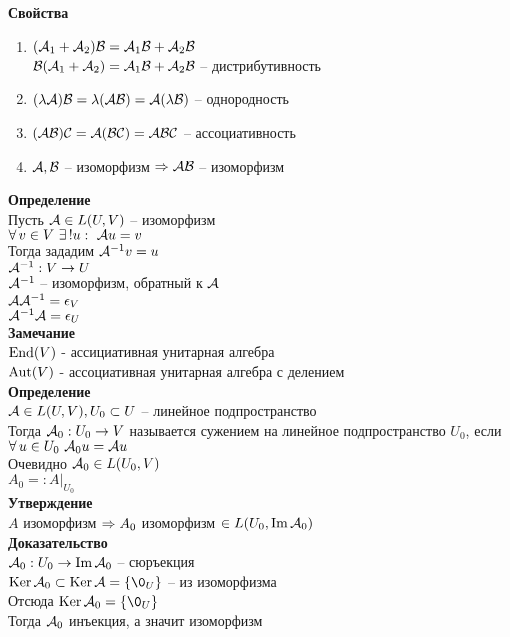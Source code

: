 \documentclass[12pt]{article}
\begin{document}
\textbf{Свойства}
\begin{enumerate}
    \item $(\mathcal{A}_1 + \mathcal{A}_2)\mathcal{B} = \mathcal{A}_1\mathcal{B} + \mathcal{A}_2\mathcal{B}$\\
    $\mathcal{B}(\mathcal{A}_1 + \mathcal{A}_2) = \mathcal{A}_1\mathcal{B} + \mathcal{A}_2\mathcal{B}$ -- дистрибутивность
    \item $(\lambda \mathcal{A})\mathcal{B} = \lambda (\mathcal{A} \mathcal{B}) = \mathcal{A} (\lambda \mathcal{B})$ -- однородность
    \item $(\mathcal{A} \mathcal{B}) \mathcal{C} = \mathcal{A}(\mathcal{B}\mathcal{C}) = \mathcal{A}\mathcal{B}\mathcal{C}$ -- ассоциативность
    \item $\mathcal{A}, \mathcal{B}$ -- изоморфизм $\Rightarrow \mathcal{A}\mathcal{B}$ -- изоморфизм
\end{enumerate}
\textbf{Определение}\\
Пусть $\mathcal{A} \in L(U, V)$ -- изоморфизм\\
$\forall\, v \in V\ \exists\,! u:\ \mathcal{A} u = v$\\
Тогда зададим $\mathcal{A}^{-1} v = u$\\
$\mathcal{A}^{-1}: V \rightarrow U$\\
$\mathcal{A}^{-1}$ -- изоморфизм, обратный к $\mathcal{A}$\\
$\mathcal{A}\mathcal{A}^{-1} = \epsilon_V$\\
$\mathcal{A}^{-1}\mathcal{A} = \epsilon_U$\\
\textbf{Замечание}\\
$\operatorname{End}(V)$ - ассициативная унитарная алгебра\\
$\operatorname{Aut}(V)$ - ассоциативная унитарная алгебра с делением\\
\textbf{Определение}\\
$\mathcal{A} \in L(U, V), U_0 \subset U$ -- линейное подпространство\\
Тогда $\mathcal{A}_0 : U_0 \rightarrow V$ называется сужением на линейное подпространство $U_0$, если $\forall\, u \in U_0\ \mathcal{A}_0u = \mathcal{A} u$\\
Очевидно $\mathcal{A}_0 \in L(U_0, V)$\\
$A_0 =: A|_{U_0}$\\
\textbf{Утверждение}\\
$A$ изоморфизм $\Rightarrow A_0 $ изоморфизм $\in L(U_0, \operatorname{Im} \mathcal{A}_0)$\\
\textbf{Доказательство}\\
$\mathcal{A}_0: U_0 \rightarrow \operatorname{Im} \mathcal{A}_0$ -- сюръекция\\
$\ker \mcA_0 \subset \ker \mcA = \{ \0_U \}$ -- из изоморфизма\\
Отсюда $\ker \mcA_0 = \{ \0_U\}$\\
Тогда $\mathcal{A}_0$ инъекция, а значит изоморфизм\\
\end{document}

